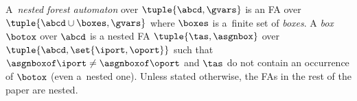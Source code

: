 {A~\emph{nested forest automaton} over $\tuple{\abcd, \gvars}$ is an FA
over $\tuple{\abcd \cup \boxes, \gvars}$ where $\boxes$ is a~finite set of
\emph{boxes}. A \emph{box} $\botox$ over $\abcd$ %
is a nested FA $\tuple{\tas, \asgnbox}$ over $\tuple{\abcd, \set{ \iport, \oport}}$
such that $\asgnboxof \iport \neq \asgnboxof \oport$ and
$\tas$ do not contain an occurrence of $\botox$ (even a~nested one).
Unless stated otherwise, the FAs in the rest of the paper are nested.



}
